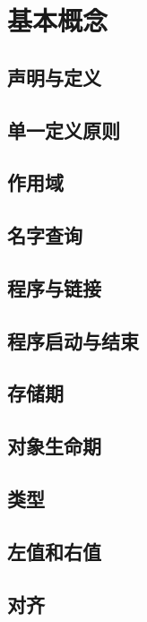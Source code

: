 \chapter{基本概念}

\section{声明与定义}
\section{单一定义原则}
\section{作用域}
\section{名字查询}
\section{程序与链接}
\section{程序启动与结束}
\section{存储期}
\section{对象生命期}
\section{类型}
\section{左值和右值}
\section{对齐}
